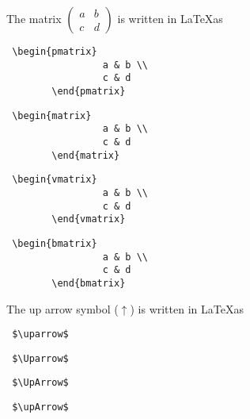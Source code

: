 \documentclass{exam}
\begin{document}
\begin{questions}
\question The matrix $\begin{pmatrix} a & b \\ c & d \end{pmatrix}$ is written in \LaTeX as  %
\begin{multicols}{2}
	\begin{choices}
		\choice \begin{verbatim} \begin{pmatrix}
				 a & b \\
				 c & d
		\end{pmatrix} \end{verbatim}
		\choice \begin{verbatim} \begin{matrix}
				 a & b \\
				 c & d
		\end{matrix} \end{verbatim}
		\choice \begin{verbatim} \begin{vmatrix}
				 a & b \\
				 c & d
		\end{vmatrix} \end{verbatim}
		\choice \begin{verbatim} \begin{bmatrix}
				 a & b \\
				 c & d
		\end{bmatrix} \end{verbatim}
	\end{choices}
\end{multicols}

\question The up arrow symbol ($\uparrow$) is written in \LaTeX  as %
\begin{multicols}{2}
	\begin{choices}
		\choice \begin{verbatim} $\uparrow$ \end{verbatim}
		\choice \begin{verbatim} $\Uparrow$ \end{verbatim}
		\choice \begin{verbatim} $\UpArrow$ \end{verbatim}
		\choice \begin{verbatim} $\upArrow$ \end{verbatim}
	\end{choices}
\end{multicols}


\end{questions}
\end{document}
